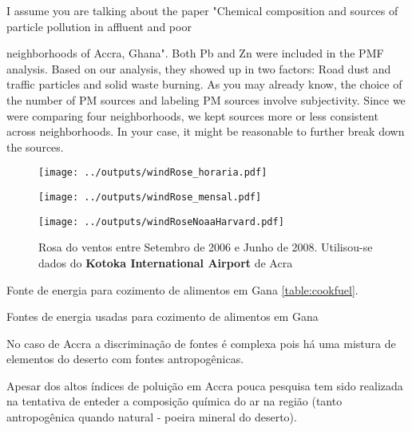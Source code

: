 I assume you are talking about the paper "Chemical composition and sources of particle pollution in affluent and poor

neighborhoods of Accra, Ghana". Both Pb and Zn were included in the PMF analysis. Based on our analysis, they showed up in two factors: Road dust and traffic particles and solid waste burning. As you may already know, the choice of the number of PM sources and labeling PM sources involve subjectivity. Since we were comparing four neighborhoods, we kept sources more or less consistent across neighborhoods. In your case, it might be reasonable to further break down the sources.

\begin{figure}[H]
  \centering
  \texttt{[image: ../outputs/windRose\_horaria.pdf]}
  \caption{ \citep{carslaw2012} \label{fig:windRose_horaria}}
\end{figure}

\begin{figure}[H]
  \centering
  \texttt{[image: ../outputs/windRose\_mensal.pdf]}
  \caption{ \citep{carslaw2012} \label{fig:windRose_mensal}}
\end{figure}


\begin{figure}[H]
  \centering
  \texttt{[image: ../outputs/windRoseNoaaHarvard.pdf]}
  \caption{Rosa do ventos entre
           Setembro de 2006 e Junho de 2008. Utilisou-se dados 
           do \textbf{Kotoka International Airport} de Acra \label{fg:rosaCompleta}}
\end{figure}

Fonte de energia para cozimento de alimentos em Gana \ref{table:cookfuel}.
\begin{table}[H]
 \centering
  
  \caption{Fontes de energia usadas para cozimento de alimentos em 
           Gana \citep{ghanacensus2013} \label{table:cookfuel}}
\end{table}

No caso de Accra a discriminação de fontes é complexa pois
há uma mistura de elementos do deserto com fontes antropogênicas.

Apesar dos altos índices de poluição em Accra pouca pesquisa tem sido 
realizada na tentativa de enteder a composição química do ar na região
(tanto antropogênica quando natural - poeira mineral do deserto). 

